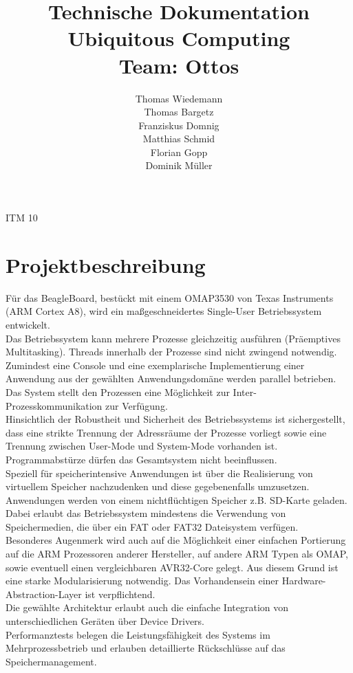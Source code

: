\documentclass[10pt,a4paper]{article}
\begin{document}
\title{Technische Dokumentation\\\bigskip
Ubiquitous Computing\\
Team: Ottos }
\author{
Thomas Wiedemann\\ 
Thomas Bargetz\\
Franziskus Domnig\\
Matthias Schmid \\
Florian Gopp\\
Dominik Müller\\ }

\maketitle
\begin{center}
ITM 10\\\bigskip


\end{center}

\newpage
\tableofcontents
\newpage
\section{Projektbeschreibung}
Für das BeagleBoard, bestückt mit einem OMAP3530 von Texas Instruments (ARM Cortex A8), wird ein maßgeschneidertes Single-User Betriebssystem entwickelt.\\
Das Betriebssystem kann mehrere Prozesse gleichzeitig ausführen (Präemptives Multitasking). Threads innerhalb der Prozesse sind nicht zwingend notwendig. Zumindest eine Console und eine exemplarische Implementierung einer Anwendung aus der gewählten Anwendungsdomäne werden parallel betrieben. Das System stellt den Prozessen eine Möglichkeit zur Inter-Prozesskommunikation zur Verfügung.\\
Hinsichtlich der Robustheit und Sicherheit des Betriebssystems ist sichergestellt, dass eine strikte Trennung der Adressräume der Prozesse vorliegt sowie eine Trennung zwischen User-Mode und System-Mode vorhanden ist. Programmabstürze dürfen das Gesamtsystem nicht beeinflussen.\\
Speziell für speicherintensive Anwendungen ist über die Realisierung von virtuellem Speicher nachzudenken und diese gegebenenfalls umzusetzen.\\
Anwendungen werden von einem nichtflüchtigen Speicher z.B. SD-Karte geladen. Dabei erlaubt das Betriebssystem mindestens die Verwendung von Speichermedien, die über ein FAT oder FAT32 Dateisystem verfügen.\\
Besonderes Augenmerk wird auch auf die Möglichkeit einer einfachen Portierung auf die ARM Prozessoren anderer Hersteller, auf andere ARM Typen als OMAP, sowie eventuell einen vergleichbaren AVR32-Core gelegt. Aus diesem Grund ist eine starke Modularisierung notwendig. Das Vorhandensein einer Hardware-Abstraction-Layer ist verpflichtend.\\
Die gewählte Architektur erlaubt auch die einfache Integration von unterschiedlichen Geräten über Device Drivers.\\
Performanztests belegen die Leistungsfähigkeit des Systems im Mehrprozessbetrieb und erlauben detaillierte Rückschlüsse auf das Speichermanagement.
\end{document}
